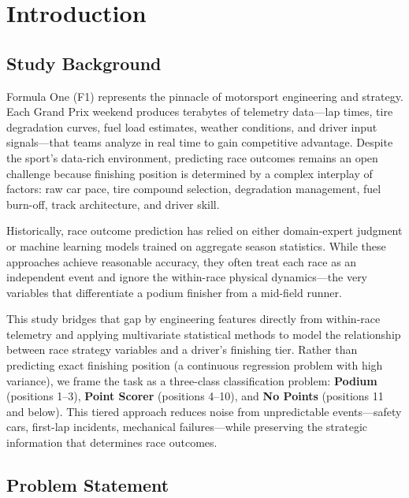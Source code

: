 \section{Introduction}

\subsection{Study Background}

Formula One (F1) represents the pinnacle of motorsport engineering and strategy.
Each Grand Prix weekend produces terabytes of telemetry data---lap times, tire
degradation curves, fuel load estimates, weather conditions, and driver input
signals---that teams analyze in real time to gain competitive advantage. Despite
the sport's data-rich environment, predicting race outcomes remains an open
challenge because finishing position is determined by a complex interplay of
factors: raw car pace, tire compound selection, degradation management, fuel
burn-off, track architecture, and driver skill.

Historically, race outcome prediction has relied on either domain-expert
judgment or machine learning models trained on aggregate season statistics.
While these approaches achieve reasonable accuracy, they often treat each race
as an independent event and ignore the within-race physical dynamics---the
very variables that differentiate a podium finisher from a mid-field runner.

This study bridges that gap by engineering features directly from within-race
telemetry and applying multivariate statistical methods to model the
relationship between race strategy variables and a driver's finishing tier.
Rather than predicting exact finishing position (a continuous regression
problem with high variance), we frame the task as a three-class classification
problem: \textbf{Podium} (positions 1--3), \textbf{Point Scorer} (positions
4--10), and \textbf{No Points} (positions 11 and below). This tiered approach
reduces noise from unpredictable events---safety cars, first-lap incidents,
mechanical failures---while preserving the strategic information that
determines race outcomes.

\subsection{Problem Statement}

